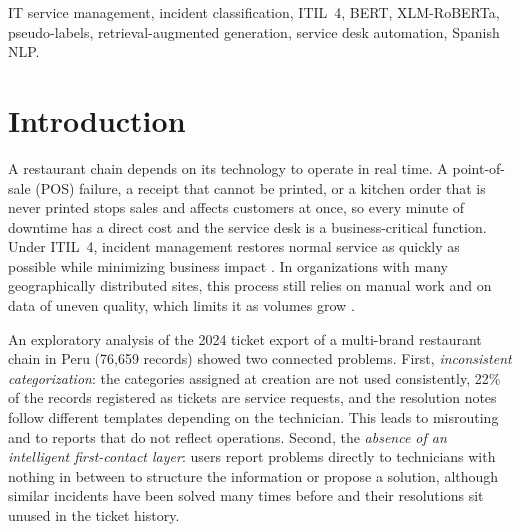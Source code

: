 \documentclass[conference]{IEEEtran}
\begin{document}
\begin{IEEEkeywords}
IT service management, incident classification, ITIL~4, BERT, XLM-RoBERTa, pseudo-labels,
retrieval-augmented generation, service desk automation, Spanish NLP.
\end{IEEEkeywords}

\section{Introduction}

A restaurant chain depends on its technology to operate in real time. A point-of-sale (POS) failure, a
receipt that cannot be printed, or a kitchen order that is never printed stops sales and affects
customers at once, so every minute of downtime has a direct cost and the service desk is a
business-critical function. Under ITIL~4, incident management restores normal service as quickly as
possible while minimizing business impact \cite{itil4}. In organizations with many geographically
distributed sites, this process still relies on manual work and on data of uneven quality, which limits it
as volumes grow \cite{zangari2023}.

An exploratory analysis of the 2024 ticket export of a multi-brand restaurant chain in Peru (76,659
records) showed two connected problems. First, \emph{inconsistent categorization}: the categories assigned at
creation are not used consistently, 22\% of the records registered as tickets are service requests, and the
resolution notes follow different templates depending on the technician. This leads to misrouting and to
reports that do not reflect operations. Second, the \emph{absence of an intelligent first-contact layer}:
users report problems directly to technicians with nothing in between to structure the information or propose a
solution, although similar incidents have been solved many times before and their resolutions sit unused in the
ticket history.
\end{document}
